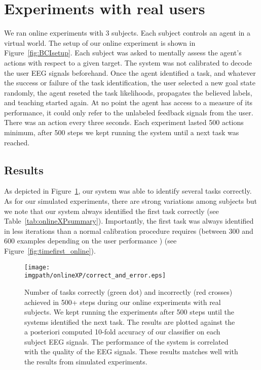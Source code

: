 \section{Experiments with real users}

We ran online experiments with 3 subjects. Each subject controls an agent in a virtual world. The setup of our online experiment is shown in Figure~\ref{fig:BCIsetup}. Each subject was asked to mentally assess the agent's actions with respect to a given target. The system was not calibrated to decode the user EEG signals beforehand. Once the agent identified a task, and whatever the success or failure of the task identification, the user selected a new goal state randomly, the agent reseted the task likelihoods, propagates the believed labels, and teaching started again. At no point the agent has access to a measure of its performance, it could only refer to the unlabeled feedback signals from the user. There was an action every three seconds. Each experiment lasted 500 actions minimum, after 500 steps we kept running the system until a next task was reached.

\subsection*{Results} As depicted in Figure~\ref{fig:correcterror_online}, our system was able to identify several tasks correctly. As for our simulated experiments, there are strong variations among subjects but we note that our system always identified the first task correctly (see Table~\ref{tab:onlineXPsummary}). Importantly, the first task was always identified in less iterations than a normal calibration procedure requires (between 300 and 600 examples depending on the user performance \cite{chavarriaga2010learning,iturrate2010single}) (see Figure~\ref{fig:timefirst_online}).


\begin{figure}[!htbp]
\centering
\texttt{[image: \\imgpath/onlineXP/correct\_and\_error.eps]}
\caption{Number of tasks correctly (green dot) and incorrectly (red crosses) achieved in 500+ steps during our online experiments with real subjects. We kept running the experiments after 500 steps until the systems identified the next task. The results are plotted against the a posteriori computed 10-fold accuracy of our classifier on each subject EEG signals. The performance of the system is correlated with the quality of the EEG signals. These results matches well with the results from simulated experiments.}
\label{fig:correcterror_online}
\end{figure} 


